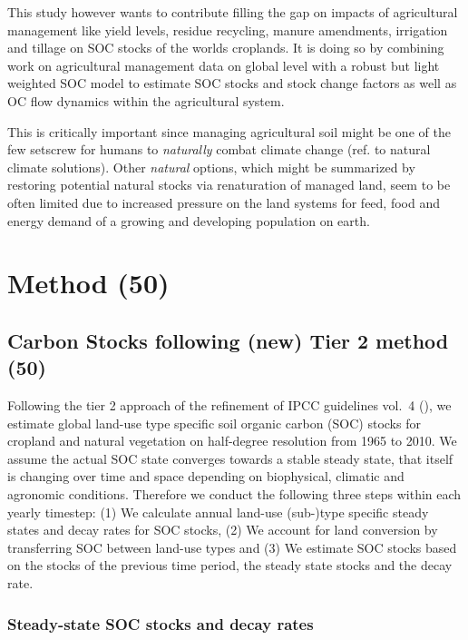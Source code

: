 \documentclass[gc, manuscript]{copernicus}
\begin{document}
This study however wants to contribute filling the gap on impacts of
agricultural management like yield levels, residue recycling, manure
amendments, irrigation and tillage on SOC stocks of the worlds
croplands. It is doing so by combining work on agricultural management
data on global level with a robust but light weighted SOC model to
estimate SOC stocks and stock change factors as well as OC flow dynamics
within the agricultural system.

This is critically important since managing agricultural soil might be
one of the few setscrew for humans to \emph{naturally} combat climate
change (ref. to natural climate solutions). Other \emph{natural}
options, which might be summarized by restoring potential natural stocks
via renaturation of managed land, seem to be often limited due to
increased pressure on the land systems for feed, food and energy demand
of a growing and developing population on earth.

\newpage

\section{Method (50)}

\hypertarget{sec:carbonbudget}{%
\subsection{Carbon Stocks following (new) Tier 2 method
(50)}\label{sec:carbonbudget}}

Following the tier 2 approach of the refinement of IPCC guidelines
vol.~4 (\citet{ipcc_2019_2019}), we estimate global land-use type
specific soil organic carbon (SOC) stocks for cropland and natural
vegetation on half-degree resolution from 1965 to 2010. We assume the
actual SOC state converges towards a stable steady state, that itself is
changing over time and space depending on biophysical, climatic and
agronomic conditions. Therefore we conduct the following three steps
within each yearly timestep: (1) We calculate annual land-use (sub-)type
specific steady states and decay rates for SOC stocks, (2) We account
for land conversion by transferring SOC between land-use types and (3)
We estimate SOC stocks based on the stocks of the previous time period,
the steady state stocks and the decay rate.

\subsubsection{Steady-state SOC stocks and decay rates}
\end{document}
